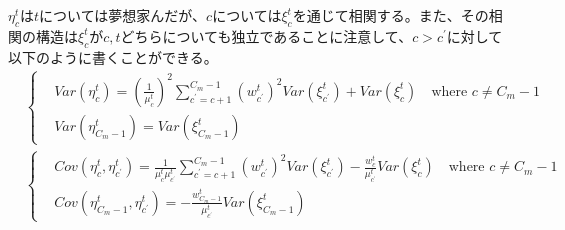 \documentclass{jsarticle}
\begin{document}
$\eta_c^t$は$t$については夢想家んだが、$c$については$\xi_c^t$を通じて相関する。また、その相関の構造は$\xi_c^t$が$c,t$どちらについても独立であることに注意して、$c > c^{'}$に対して以下のように書くことができる。
\begin{align*}
&\begin{cases}
	&Var(\eta_c^t) = \left( \frac{1}{\mu_c^t} \right)^2 \sum_{c^{'} = c+1}^{C_m-1} \left( w_{c^{'}}^t \right)^2 Var(\xi_{c^{'}}^t) + Var(\xi_c^t)\quad \text{where $c \neq C_m-1$}\\[8pt]
	&Var(\eta_{C_m-1}^t) = Var(\xi_{C_m-1}^t)
\end{cases}\\[8pt]
&\begin{cases}
	&Cov(\eta_c^t, \eta_{c^{'}}^t) = \frac{1}{\mu_c^t \mu_{c^{'}}^t} \sum_{c^{'} = c+1}^{C_m-1} \left( w_{c^{'}}^t \right)^2 Var(\xi_{c^{'}}^t) - \frac{w_c^t}{\mu_{c^{'}}^t}Var(\xi_c^t)\quad \text{where $c \neq C_m-1$}\\[8pt]
	&Cov(\eta_{C_m-1}^t, \eta_{c^{'}}^t) = -\frac{w_{C_m-1}^t}{\mu_{c^{'}}^t} Var(\xi_{C_m-1}^t)
\end{cases}
\end{align*}
\end{document}
